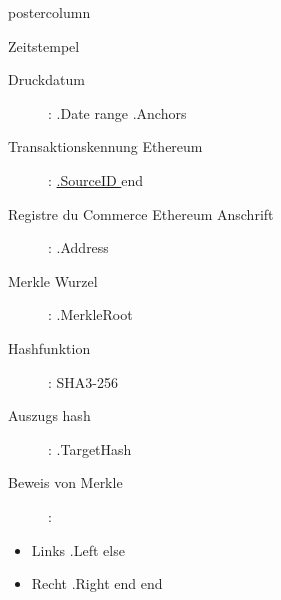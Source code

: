 \documentclass[roundedcorners=true, titleposition=center]{beamerthemeruhuisstijlposter}
\begin{document}
\begin{frame}
\begin{columns}
\begin{column}{0.95\textwidth}
\begin{beamercolorbox}[center, wd=\textwidth]{postercolumn}
\begin{minipage}[T]{0.95\textwidth}
    \hfill
\parbox[t][\columnheight]{\textwidth}{%

\begin{block}{Zeitstempel}
\begin{description}
    \item [Druckdatum] :\linebreak
{{ .Date }}
{{ range .Anchors }}
\item [Transaktionskennung Ethereum] :\linebreak
\href{https://etherscan.io/tx/0x{{ .SourceID }} }{ {{.SourceID }} }
{{ end }}
\item[Registre du Commerce Ethereum Anschrift] :\linebreak
{{ .Address }}
\item[Merkle Wurzel] :\linebreak
{{ .MerkleRoot }}
\item[Hashfunktion] : \linebreak
SHA3-256
\item[Auszugs hash] :\linebreak
{{ .TargetHash }}
\item[Beweis von Merkle] :
\end{description}
\begin{itemize}
{{ range .Proof }}
    {{ if .Left }}
        \item Links {{ .Left }}
    {{ else }}
        \item Recht {{ .Right }}
    {{ end }}
{{ end }}
\end{itemize}
\end{block}
}
\end{minipage}
\end{beamercolorbox}
\end{column}
\end{columns}
\end{frame}
\end{document}
